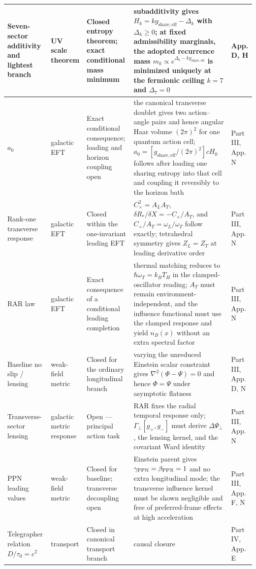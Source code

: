 \documentclass[11pt]{article}
\begin{document}
\begin{longtable}{|L{0.18\textwidth}|L{0.13\textwidth}|L{0.16\textwidth}|L{0.33\textwidth}|L{0.13\textwidth}|}
\hline
Seven-sector additivity and lightest branch & UV scale theorem & Closed entropy theorem; exact conditional mass minimum & subadditivity gives $H_k=kg_{\mathrm{share,eff}}-\Delta_k$ with $\Delta_k\ge0$; at fixed admissibility marginals, the adopted recurrence mass $m_k\propto e^{\Delta_k-kg_{\mathrm{share,eff}}}$ is minimized uniquely at the fermionic ceiling $k=7$ and $\Delta_7=0$ & App. D, H \\
\hline
$a_0$ & galactic EFT & Exact conditional consequence; loading and horizon coupling open & the canonical transverse doublet gives two action--angle pairs and hence angular Haar volume $(2\pi)^2$ for one quantum action cell; $a_0=[g_{\mathrm{share,eff}}/(2\pi)^2]cH_0$ follows after loading one sharing entropy into that cell and coupling it reversibly to the horizon bath & Part III, App. N \\
\hline
Rank-one transverse response & galactic EFT & Closed within the one-invariant leading EFT & $C_\times^2=A_LA_T$, $\delta R_*/\delta X=-C_\times/A_T$, and $C_\times/A_T=\omega_L/\omega_T$ follow exactly; tetrahedral symmetry gives $Z_L=Z_T$ at leading derivative order & Part III, App. N \\
\hline
RAR law & galactic EFT & Exact consequence of a conditional leading completion & thermal matching reduces to $\hbar\omega_T=k_BT_H$ in the clamped-oscillator reading; $A_T$ must remain environment-independent, and the influence functional must use the clamped response and yield $n_B(x)$ without an extra spectral factor & Part III, App. N \\
\hline
Baseline no slip / lensing & weak-field metric & Closed for the ordinary longitudinal branch & varying the unreduced Einstein scalar constraint gives $\nabla^2(\Phi-\Psi)=0$ and hence $\Phi=\Psi$ under asymptotic flatness & Part III, App. D, N \\
\hline
Transverse-sector lensing & galactic metric response & Open --- principal action task & RAR fixes the radial temporal response only; $\Gamma_\perp[g_+,g_-]$ must derive $\Delta\Psi_\perp$, the lensing kernel, and the covariant Ward identity & Part III, App. N \\
\hline
PPN leading values & weak-field metric & Closed for baseline; transverse decoupling open & Einstein parent gives $\gamma_{\rm PPN}=\beta_{\rm PPN}=1$ and no extra longitudinal mode; the transverse influence kernel must be shown negligible and free of preferred-frame effects at high acceleration & Part III, App. F, N \\
\hline
Telegrapher relation $D/\tau_0=c^2$ & transport & Closed in canonical transport branch & causal closure & Part IV, App. E \\

\end{longtable}
\end{document}
